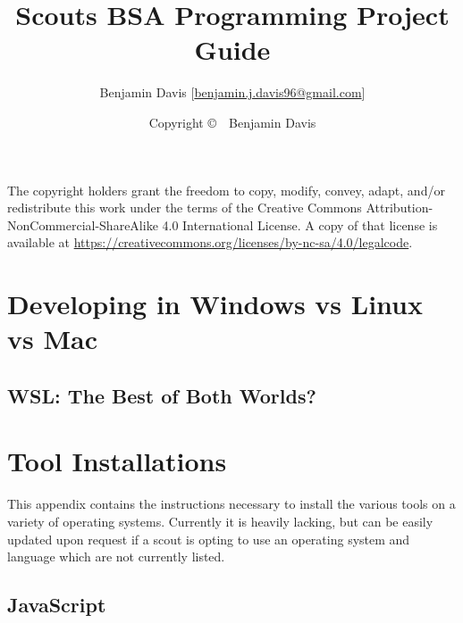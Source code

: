 \documentclass[letterpaper,12pt]{book}
\title{Scouts BSA Programming Project Guide}
\author{
  Benjamin Davis [\href{mailto:benjamin.j.davis96@gmail.com}{benjamin.j.davis96@gmail.com}]
}
\date{Copyright \copyright\ \the\year\ Benjamin Davis}
\begin{document}
  \pagestyle{simple}
  \maketitle
  
  \begin{center}
    \vspace*{\fill}
    The copyright holders grant the freedom to copy, modify, convey, adapt, and/or redistribute this work
    under the terms of the Creative Commons Attribution-NonCommercial-ShareAlike 4.0
    International License. A copy of that license is available at
    \url{https://creativecommons.org/licenses/by-nc-sa/4.0/legalcode}.
    \vspace*{\fill}
  \end{center}

  \frontmatter
  \pagestyle{plain}

  \tableofcontents

  \mainmatter

  

  

  

  

  

\appendix

  \chapter{Developing in Windows vs Linux vs Mac}
  \label{app:dev_os}

    \section{WSL: The Best of Both Worlds?}

  \chapter{Tool Installations}
  \label{app:tool_installations}
    This appendix contains the instructions necessary to install the various tools on a variety of operating
      systems.
    Currently it is heavily lacking, but can be easily updated upon request if a scout is opting to use
      an operating system and language which are not currently listed.

    \section{JavaScript}
\end{document}

